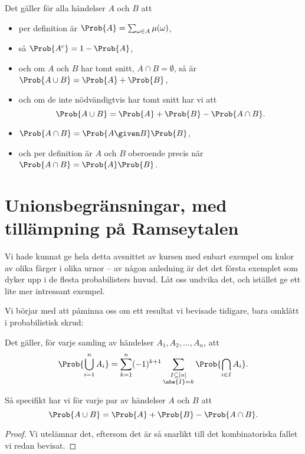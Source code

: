 \documentclass[nobib]{tufte-handout}
\begin{document}
\begin{lemma}
    Det gäller för alla händelser $A$ och $B$ att
    \begin{itemize}
        \item per definition är $\Prob{A} = \sum_{\omega \in A} \mu(\omega)$,
        \item så $\Prob{A^c} = 1 - \Prob{A}$,
        \item och om $A$ och $B$ har tomt snitt, $A\cap B = \emptyset$, så är $\Prob{A \cup B} = \Prob{A} + \Prob{B}$,
        \item och om de inte nödvändigtvis har tomt snitt har vi att
        $$\Prob{A \cup B} = \Prob{A} + \Prob{B} - \Prob{A \cap B}.$$
        \item $\Prob{A \cap B} = \Prob{A \given B}\Prob{B}$,
        \item och per definition är $A$ och $B$ oberoende precis när $\Prob{A \cap B} = \Prob{A}\Prob{B}$.
    \end{itemize}
\end{lemma}

\section{Unionsbegränsningar, med tillämpning på Ramseytalen}

Vi hade kunnat ge hela detta avsnittet av kursen med enbart exempel om kulor av olika färger i olika urnor -- av någon anledning är det det första exemplet som dyker upp i de flesta probabilisters huvud. Låt oss undvika det, och istället ge ett lite mer intressant exempel.

Vi börjar med att påminna oss om ett resultat vi bevisade tidigare, bara omklätt i probabilistisk skrud:

\begin{lemma}
    Det gäller, för varje samling av händelser $A_1, A_2, \ldots, A_n$, att
    $$\Prob{\bigcup_{i=1}^n A_i} = \sum_{k=1}^{n} (-1)^{k+1}\sum_{\substack{I \subseteq [n]\\\abs{I} = k}} \Prob{\bigcap_{i\in I} A_i}.$$

    Så specifikt har vi för varje par av händelser $A$ och $B$ att
    $$\Prob{A \cup B} = \Prob{A} + \Prob{B} - \Prob{A \cap B}.$$

    \begin{proof}
        Vi utelämnar det, eftersom det är så snarlikt till det kombinatoriska fallet vi redan bevisat.
    \end{proof}
\end{lemma}
\end{document}
